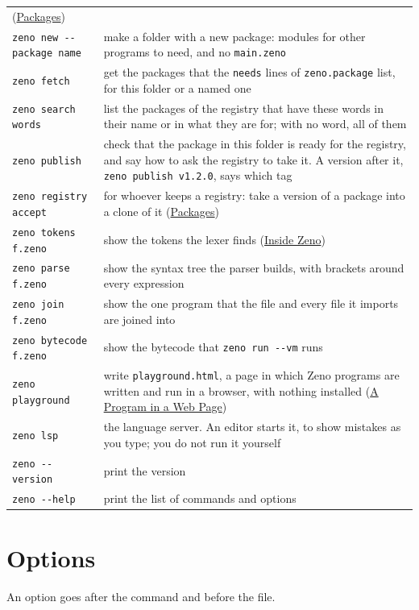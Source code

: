 \begin{longtable}{lP{8.6cm}}
  (\hyperref[ch-packages]{Packages}) \\
\verb|zeno new --package name| & make a folder with a new package: modules
  for other programs to need, and no \verb|main.zeno| \\
\verb|zeno fetch| & get the packages that the \verb|needs| lines of
  \verb|zeno.package| list, for this folder or a named one \\
\verb|zeno search words| & list the packages of the registry that have
  these words in their name or in what they are for; with no word, all
  of them \\
\verb|zeno publish| & check that the package in this folder is ready
  for the registry, and say how to ask the registry to take it. A
  version after it, \verb|zeno publish v1.2.0|, says which tag \\
\verb|zeno registry accept| & for whoever keeps a registry: take a
  version of a package into a clone of it
  (\hyperref[ch-packages]{Packages}) \\
\verb|zeno tokens f.zeno| & show the tokens the lexer finds
  (\hyperref[ch-inside]{Inside Zeno}) \\
\verb|zeno parse f.zeno| & show the syntax tree the parser builds, with
  brackets around every expression \\
\verb|zeno join f.zeno| & show the one program that the file and every
  file it imports are joined into \\
\verb|zeno bytecode f.zeno| & show the bytecode that \verb|zeno run --vm|
  runs \\
\verb|zeno playground| & write \verb|playground.html|, a page in which
  Zeno programs are written and run in a browser, with nothing installed
  (\hyperref[ch-web]{A Program in a Web Page}) \\
\verb|zeno lsp| & the language server. An editor starts it, to show
  mistakes as you type; you do not run it yourself \\
\verb|zeno --version| & print the version \\
\verb|zeno --help| & print the list of commands and options \\
\bottomrule
\end{longtable}

\section{Options}

An option goes after the command and before the file.

